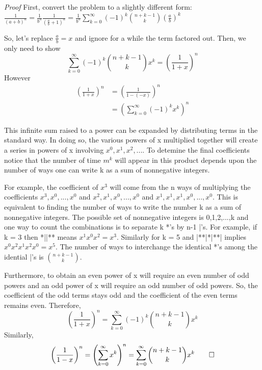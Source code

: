 \documentclass[10pt,]{book}
\makeatletter
\renewcommand*{\proofname}{Proof}
\renewenvironment{proof}[1][\proofname]{\par
  \pushQED{\qed}%
  \normalfont \topsep6\p@\@plus6\p@\relax
  \trivlist
  \item\relax
    {\itshape
    #1\@addpunct{.}}\hspace\labelsep\ignorespaces
}{%
  \popQED\endtrivlist\@endpefalse
}
\numberwithin{equation}{section}
\makeatother
\begin{document}
\begin{proof}\hypertarget{proof-49}{}
\hypertarget{p-968}{}%
First, convert the problem to a slightly different form: \(\frac{1}{(a+b)^n} = \frac{1}{b^n} \frac{1}{(\frac{a}{b}+1)^n} 
= \frac{1}{b^n} \sum_{k=0}^{\infty} {(-1)^k \binom{n + k - 1}{k} \left ( \frac{a}{b} \right ) ^k}\)%
\par
\hypertarget{p-969}{}%
So, let's replace \(\frac{a}{b} = x\) and ignore for a while the term factored out. Then, we only need to show%
\begin{equation*}
\sum_{k=0}^{\infty} {(-1)^k \binom{n + k - 1}{k} x^k} = \left ( \frac{1}{1+x} \right )^n 
\end{equation*}
However%
\begin{align*}
\left ( \frac{1}{1+x} \right )^n & = \left ( \frac{1}{1 - (-x)} \right )^n \\
& = \left ( \sum_{k=0}^{\infty} {(-1)^k x^k} \right )^n
\end{align*}
%
\par
\hypertarget{p-970}{}%
This infinite sum raised to a power can be expanded by distributing terms in the standard way. In doing so, the various powers of x multiplied together will create a series in powers of x involving \(x^0, x^1, x^2, ...\). To detemine the final coefficients notice that the number of time \(m^k\) will appear in this product depends upon the number of ways one can write k as a sum of nonnegative integers.%
\par
\hypertarget{p-971}{}%
For example, the coefficient of \(x^3\) will come from the n ways of multiplying the coefficients \(x^3, x^0, ..., x^0\) and \(x^2, x^1, x^0, ..., x^0\) and \(x^1, x^1, x^1, x^0,..., x^0\). This is equivalent to finding the number of ways to write the number k as a sum of nonnegative integers. The possible set of nonnegative integers is {0,1,2,...,k} and one way to count the combinations is to separate k *'s by n-1 |'s.  For example, if k = 3 then *||** means \(x^1 x^0 x^2 = x^3\). Similarly for k = 5 and |**|*|**| implies \(x^0 x^2 x^1 x^2 x^0 = x^5\).  The number of ways to interchange the identical *'s among the idential |'s is \(\binom{n+k-1}{k}\).%
\par
\hypertarget{p-972}{}%
Furthermore, to obtain an even power of x will require an even number of odd powers and an odd power of x will require an odd number of odd powers. So, the coefficient of the odd terms stays odd and the coefficient of the even terms remains even. Therefore,%
\begin{equation*}
\left ( \frac{1}{1+x} \right )^n = \sum_{k=0}^{\infty} {(-1)^k \binom{n + k - 1}{k} x^k}
\end{equation*}
Similarly,%
\begin{equation*}
\left ( \frac{1}{1-x} \right )^n = \left ( \sum_{k=0}^{\infty} {x^k} \right )^n = \sum_{k=0}^{\infty} {\binom{n + k - 1}{k} x^k}\qedhere
\end{equation*}
%
\end{proof}
\end{document}
